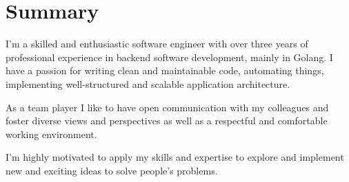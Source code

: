 \section{Summary}
I’m a skilled and enthusiastic software engineer with over three years
of professional experience in backend software development, mainly in
Golang. I have a passion for writing clean and maintainable code,
automating things, implementing well-structured and scalable
application architecture.

\vspace{0.4em}
As a team player I like to have open communication with my
colleagues and foster diverse views and perspectives as well as a
respectful and comfortable working environment.

\vspace{0.4em}
I’m highly motivated to apply my skills and expertise to explore and
implement new and exciting ideas to solve people’s problems.



